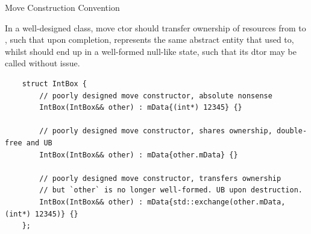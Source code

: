 \begin{frame}[fragile]{Move Construction Convention}
  \begin{sqt:result}
    In a well-designed class, move ctor should transfer ownership of resources from
     to , such that upon completion,  represents the same abstract entity
    that  used to, whilst  should end up in a well-formed null-like state,
    such that its dtor may be called without issue.
  \end{sqt:result}

  \begin{verbatim}
    struct IntBox {
        // poorly designed move constructor, absolute nonsense
        IntBox(IntBox&& other) : mData{(int*) 12345} {}

        // poorly designed move constructor, shares ownership, double-free and UB
        IntBox(IntBox&& other) : mData{other.mData} {}

        // poorly designed move constructor, transfers ownership
        // but `other` is no longer well-formed. UB upon destruction.
        IntBox(IntBox&& other) : mData{std::exchange(other.mData, (int*) 12345)} {}
    };
  \end{verbatim}
\end{frame}







  

